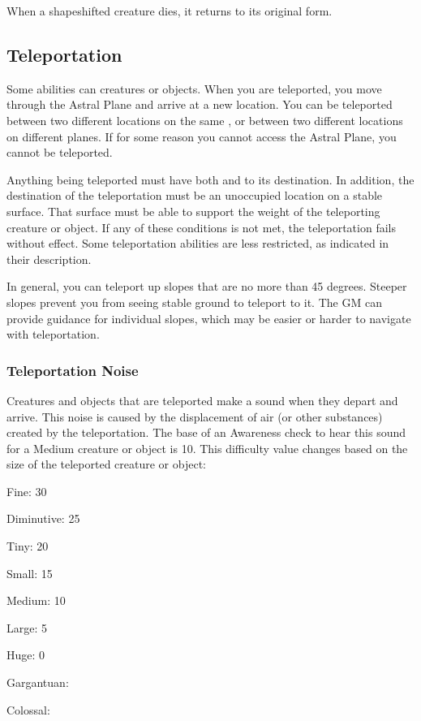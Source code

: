     When a shapeshifted creature dies, it returns to its original form.

  \subsection{Teleportation}\label{Teleportation}
    Some abilities can  creatures or objects.
    When you are teleported, you move through the Astral Plane and arrive at a new location.
    You can be teleported between two different locations on the same , or between two different locations on different planes.
    If for some reason you cannot access the Astral Plane, you cannot be teleported.

    Anything being teleported must have both  and  to its destination.
    In addition, the destination of the teleportation must be an unoccupied location on a stable surface.
    That surface must be able to support the weight of the teleporting creature or object.
    If any of these conditions is not met, the teleportation fails without effect.
    Some teleportation abilities are less restricted, as indicated in their description.

    In general, you can teleport up slopes that are no more than 45 degrees.
    Steeper slopes prevent you from seeing stable ground to teleport to it.
    The GM can provide guidance for individual slopes, which may be easier or harder to navigate with teleportation.

    \subsubsection{Teleportation Noise}\label{Teleportation Noise}
      Creatures and objects that are teleported make a sound when they depart and arrive.
      This noise is caused by the displacement of air (or other substances) created by the teleportation.
      The base  of an Awareness check to hear this sound for a Medium creature or object is 10.
      This difficulty value changes based on the size of the teleported creature or object:

      \begin{raggeditemize}
        \item Fine: 30
        \item Diminutive: 25
        \item Tiny: 20
        \item Small: 15
        \item Medium: 10
        \item Large: 5
        \item Huge: 0
        \item Gargantuan: 
        \item Colossal: 
      \end{raggeditemize}

